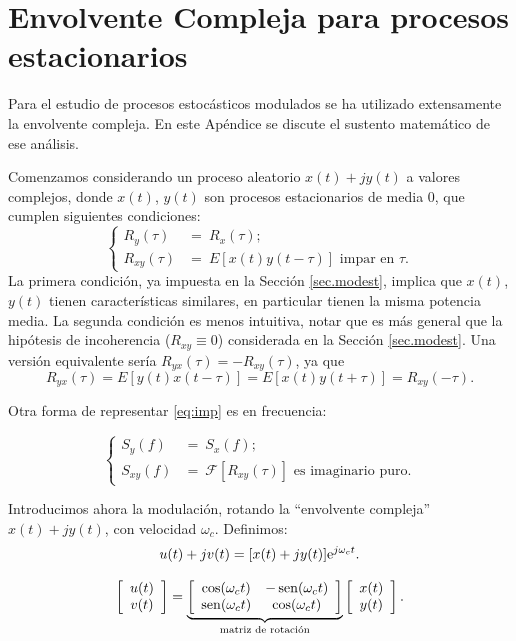 \section{Envolvente Compleja para procesos estacionarios}

Para el estudio de procesos estocásticos modulados se ha utilizado extensamente
la envolvente compleja. En este Apéndice se discute el sustento matemático de ese análisis. 


Comenzamos considerando un proceso aleatorio $x(t) + j y(t)$ a valores complejos,
donde  $x(t)$, $y(t)$ son procesos estacionarios de media 0, que cumplen siguientes condiciones: 
\begin{equation*}
    \label{eq:imp}
    \begin{cases}
R_y(\tau)&=\ R_x(\tau);\\
                    R_{xy}(\tau)&=\ E\left[x(t)y(t-\tau)\right]\text{ impar en
                    $\tau$}.
                    \end{cases}
                \tag{\#}
\end{equation*}
La primera condición, ya impuesta en la Sección \ref{sec.modest},  implica que $x(t)$, $y(t)$ tienen
características similares, en particular tienen la misma potencia media. La segunda condición es menos intuitiva, notar que es más general que la hipótesis de incoherencia ($R_{xy}\equiv 0$) considerada en la Sección \ref{sec.modest}. Una versión  equivalente sería  $R_{yx}(\tau)=-R_{xy}(\tau)$, ya que
\[R_{yx}(\tau)=E\left[y(t)x(t-\tau)\right]=E\left[x(t)y(t+\tau)\right]=R_{xy}(-\tau).\]

 Otra forma de representar
\eqref{eq:imp} es en frecuencia:

\[\begin{cases} S_y(f)&= \ S_x(f);\\
                S_{xy}(f)&= \ \mathcal{F}\left[R_{xy}(\tau)\right]\text{ es imaginario
                puro}.
              \end{cases}\tag{\#}\]


Introducimos ahora la modulación, rotando la ``envolvente
compleja'' $x(t)+jy(t)$, con velocidad $\omega_c$. Definimos:
\[u(t)+jv(t)=[x(t)+jy(t)]\mathrm{e}^{j\omega_ct}.\]

\begin{equation*}
    \left[\begin{array}{c}
            u(t)\\
            v(t)
          \end{array}\right]
    = \underbrace{\left[\begin{array}{cc}
                \cos(\omega_ct) & -\operatorname{sen}(\omega_ct)\\
                \operatorname{sen}(\omega_ct) & \cos(\omega_ct)
            \end{array}\right]}_{\text{matriz de rotación}}
    \left[\begin{array}{c}
            x(t)\\
            y(t)
          \end{array}\right].
\end{equation*}


